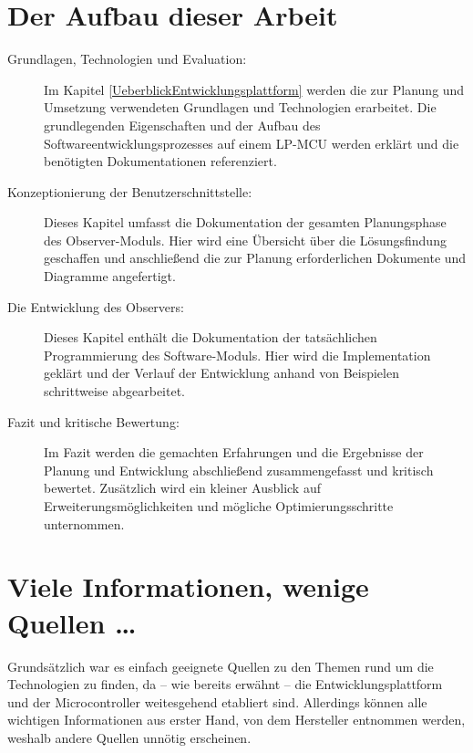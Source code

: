 \section{Der Aufbau dieser Arbeit}
\label{sec:AufbauDieserArbeit}

\begin{description}

	\item[Grundlagen, Technologien und Evaluation:] Im Kapitel \ref{UeberblickEntwicklungsplattform} werden die zur Planung und Umsetzung verwendeten Grundlagen und Technologien erarbeitet. Die grundlegenden Eigenschaften und der Aufbau des Softwareentwicklungsprozesses auf einem LP-MCU werden erkl\"art und die ben\"otigten Dokumentationen referenziert.
	
	\item[Konzeptionierung der Benutzerschnittstelle:] Dieses Kapitel umfasst die Dokumentation der gesamten Planungsphase des Observer-Moduls. Hier wird eine \"Ubersicht \"uber die L\"osungsfindung geschaffen und anschlie{\ss}end die zur Planung erforderlichen Dokumente und Diagramme angefertigt.
	
	\item[Die Entwicklung des Observers:] Dieses Kapitel enth\"alt die Dokumentation der tats\"achlichen Programmierung des Software-Moduls. Hier wird die Implementation gekl\"art und der Verlauf der Entwicklung anhand von Beispielen schrittweise abgearbeitet.
	
	\item[Fazit und kritische Bewertung:] Im Fazit werden die gemachten Erfahrungen und die Ergebnisse der Planung und Entwicklung abschlie{\ss}end zusammengefasst und kritisch bewertet. Zus\"atzlich wird ein kleiner Ausblick auf Erweiterungsm\"oglichkeiten und m\"ogliche Optimierungsschritte unternommen.

\end{description}


\section{Viele Informationen, wenige Quellen \dots}
\label{sec:Quellenlage}

Grunds\"atzlich war es einfach geeignete Quellen zu den Themen rund um die Technologien zu finden, da -- wie bereits erw\"ahnt -- die Entwicklungsplattform und der Microcontroller weitesgehend etabliert sind. Allerdings k\"onnen alle wichtigen Informationen aus erster Hand, von dem Hersteller entnommen werden, weshalb andere Quellen unn\"otig erscheinen.